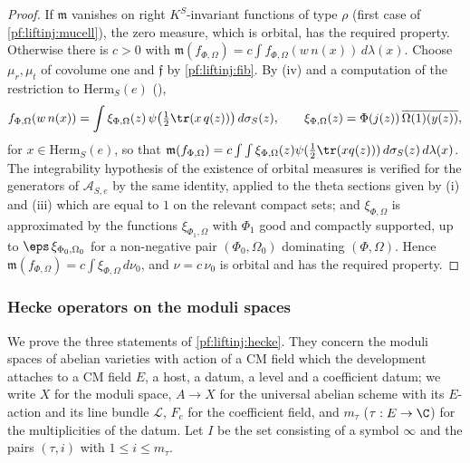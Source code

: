 \begin{proof}
If $\mathfrak m$ vanishes on right $K^S$-invariant functions of type $\rho$ (first case of \cref{pf:liftinj:mucell}), the zero measure, which is orbital,
has the required property. Otherwise there is $c>0$ with $\mathfrak m(f_{\Phi,\Omega})=c\int f_{\Phi,\Omega}(w\,n(x))\,d\lambda(x)$. Choose $\mu_r,\mu_t$ of covolume
one and $\mathfrak f$ by \cref{pf:liftinj:fib}. By (iv) and a computation of the restriction to $\mathrm{Herm}_S(e)$
(),
\[
f_{\Phi,\Omega}(w\,n(x))=\int\xi_{\Phi,\Omega}(z)\,\psi\bigl(\tfrac12\tr(x\,q(z))\bigr)\,d\sigma_S(z),\qquad
\xi_{\Phi,\Omega}(z)=\Phi(j(z))\,\overline{\Omega(1)(y(z))},
\]
for $x\in\mathrm{Herm}_S(e)$, so that $\mathfrak m(f_{\Phi,\Omega})=c\int\int\xi_{\Phi,\Omega}(z)\psi(\frac12\tr(xq(z)))\,d\sigma_S(z)\,d\lambda(x)$. The integrability
hypothesis of the existence of orbital measures is verified for the generators of $\mathcal A_{S,e}$ by the same identity, applied to the theta sections
given by (i) and (iii) which are equal to $1$ on the relevant compact sets; and $\xi_{\Phi,\Omega}$ is approximated by the functions $\xi_{\Phi_1,\Omega}$
with $\Phi_1$ good and compactly supported, up to $\eps\,\xi_{\Phi_0,\Omega_0}$ for a non-negative pair $(\Phi_0,\Omega_0)$ dominating $(\Phi,\Omega)$. Hence
$\mathfrak m(f_{\Phi,\Omega})=c\int\xi_{\Phi,\Omega}\,d\nu_0$, and $\nu=c\,\nu_0$ is orbital and has the required property.
\end{proof}

\subsubsection{Hecke operators on the moduli spaces}\label{sec:pf:liftinj:heckesec}

We prove the three statements of \cref{pf:liftinj:hecke}. They concern the moduli spaces of abelian varieties with action of a CM field which
the development attaches to a CM field $E$, a host, a datum, a level and a coefficient datum; we write $X$ for the moduli space, $A\to X$ for the
universal abelian scheme with its $E$-action and its line bundle $\mathcal L$, $F_c$ for the coefficient field, and $m_\tau$ ($\tau:E\to\C$) for the
multiplicities of the datum. Let $I$ be the set consisting of a symbol $\infty$ and the pairs $(\tau,i)$ with $1\le i\le m_\tau$.

